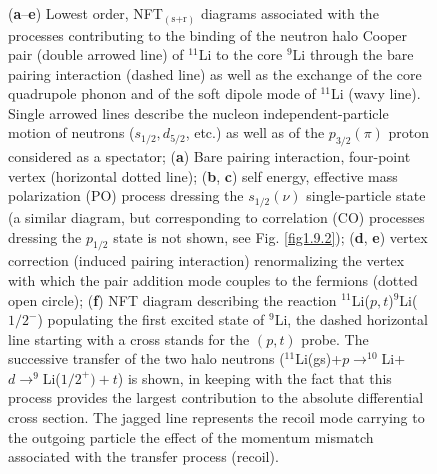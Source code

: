 \begin{figure}
          \caption{ (\textbf{a}--\textbf{e}) Lowest order, NFT$_{(\text{s+r})}$ diagrams associated with the processes contributing  to the binding of the neutron halo Cooper pair (double arrowed line) of $^{11}$Li to the core $^9$Li through the bare pairing interaction (dashed line) as well as the  exchange of the core quadrupole phonon and of the soft dipole mode of $^{11}$Li (wavy line). Single arrowed lines describe the nucleon independent-particle motion of neutrons ($s_{1/2},d_{5/2}$, etc.) as well as of the $p_{3/2}(\pi)$ proton considered as a spectator;  (\textbf{a}) Bare pairing interaction, four-point vertex (horizontal dotted line); (\textbf{b}, \textbf{c}) self energy, effective mass polarization (PO) process dressing the $s_{1/2}(\nu)$ single-particle state (a similar diagram, but corresponding to correlation (CO) processes dressing the $p_{1/2}$ state is not shown, see Fig. \ref{fig1.9.2}); (\textbf{d}, \textbf{e}) vertex correction (induced pairing interaction) renormalizing the  vertex with which the pair addition mode couples to the fermions (dotted open circle); (\textbf{f}) NFT diagram describing the reaction $^{11}$Li($p,t$)$^9$Li($1/2^-$) populating the first excited state of $^9$Li, the dashed horizontal line starting with a cross stands for the $(p,t)$ probe. The successive transfer of the two halo neutrons ($^{11}$Li(gs)+$p\rightarrow^{10}$Li+$d\rightarrow^9$Li($1/2^+)+t$) is shown, in keeping with the fact that this process provides the largest contribution to the absolute differential cross section. The jagged line represents the recoil mode carrying  to the outgoing particle the effect of the momentum mismatch associated with the transfer process (recoil). }
          \label{figintro5}
          \end{figure}
